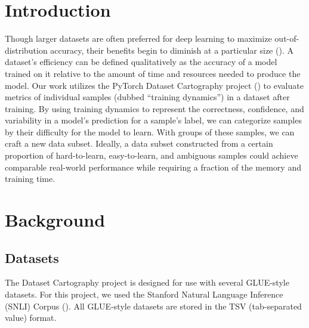 \documentclass[11pt, a4paper, twocolumn]{article}
\begin{document}
	
	
	\twocolumn[
	\begin{@twocolumnfalse}
		\maketitle
		\begin{abstract}
			\abstracttext
			\newline
			\newline
		\end{abstract}
	\end{@twocolumnfalse}
	]
	
	
	\section{Introduction}
	
	Though larger datasets are often preferred for deep learning to maximize out-of-distribution accuracy, their benefits begin to diminish at a particular size (\cite{banko-brill-2001-mitigating}). A dataset's efficiency can be defined qualitatively as the accuracy of a model trained on it relative to the amount of time and resources needed to produce the model. Our work utilizes the PyTorch Dataset Cartography project (\cite{swayamdipta2020dataset}) to evaluate metrics of individual samples (dubbed ``training dynamics'') in a dataset after training. By using training dynamics to represent the correctness, confidence, and variability in a model's prediction for a sample's label, we can categorize samples by their difficulty for the model to learn. With groups of these samples, we can craft a new data subset. Ideally, a data subset constructed from a certain proportion of hard-to-learn, easy-to-learn, and ambiguous samples could achieve comparable real-world performance while requiring a fraction of the memory and training time.
	
	\section{Background}
	
	\subsection{Datasets}
	
	The Dataset Cartography project is designed for use with several GLUE-style datasets. For this project, we used the Stanford Natural Language Inference (SNLI) Corpus (\cite{snli:emnlp2015}). All GLUE-style datasets are stored in the TSV (tab-separated value) format.
	
\end{document}
